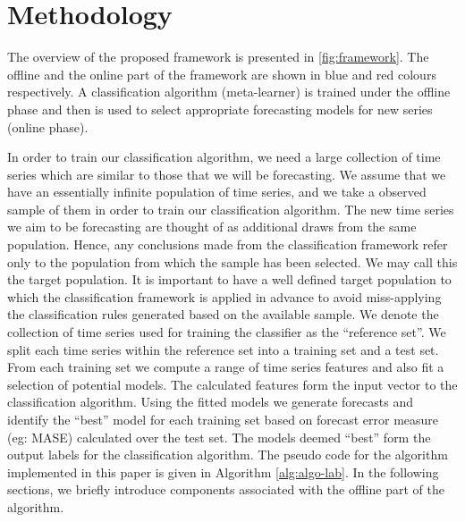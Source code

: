 \documentclass[11pt,a4paper,]{article}
\theoremstyle{definition}
\theoremstyle{definition}
\theoremstyle{definition}
\theoremstyle{remark}
\begin{document}
\section{Methodology}\label{methodology}

The overview of the proposed framework is presented in
\autoref{fig:framework}. The offline and the online part of the
framework are shown in blue and red colours respectively. A
classification algorithm (meta-learner) is trained under the offline
phase and then is used to select appropriate forecasting models for new
series (online phase).

In order to train our classification algorithm, we need a large
collection of time series which are similar to those that we will be
forecasting. We assume that we have an essentially infinite population
of time series, and we take a observed sample of them in order to train
our classification algorithm. The new time series we aim to be
forecasting are thought of as additional draws from the same population.
Hence, any conclusions made from the classification framework refer only
to the population from which the sample has been selected. We may call
this the target population. It is important to have a well defined
target population to which the classification framework is applied in
advance to avoid miss-applying the classification rules generated based
on the available sample. We denote the collection of time series used
for training the classifier as the ``reference set''. We split each time
series within the reference set into a training set and a test set. From
each training set we compute a range of time series features and also
fit a selection of potential models. The calculated features form the
input vector to the classification algorithm. Using the fitted models we
generate forecasts and identify the ``best'' model for each training set
based on forecast error measure (eg: MASE) calculated over the test set.
The models deemed ``best'' form the output labels for the classification
algorithm. The pseudo code for the algorithm implemented in this paper
is given in Algorithm \autoref{alg:algo-lab}. In the following sections,
we briefly introduce components associated with the offline part of the
algorithm.
\end{document}
